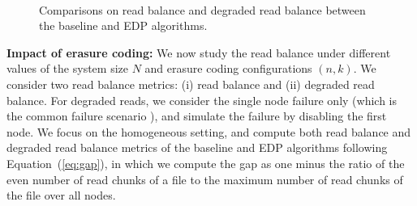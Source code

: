 



\begin{figure}[H]
\centering
{}
\\
\vspace{-6pt}
\caption{Comparisons on read balance and degraded read balance between the
baseline and EDP algorithms. }
\label{fig:balance}
\end{figure}

\textbf{Impact of erasure coding:} We now study the read balance under
different values of the system size $N$ and erasure coding configurations
$(n,k)$.  We consider two read balance metrics: (i) read balance and (ii)
degraded read balance.  For degraded reads, we consider the single node
failure only (which is the common failure scenario
\cite{ford10,Sathiamoorthy13}), and simulate the failure by disabling the
first node.  We focus on the homogeneous setting, and compute both read
balance and degraded read balance metrics of the baseline and EDP algorithms
following Equation~(\ref{eq:gap}), in which we compute the gap as one minus
the ratio of the even number of read chunks of a file to the maximum number of
read chunks of the file over all nodes.  

